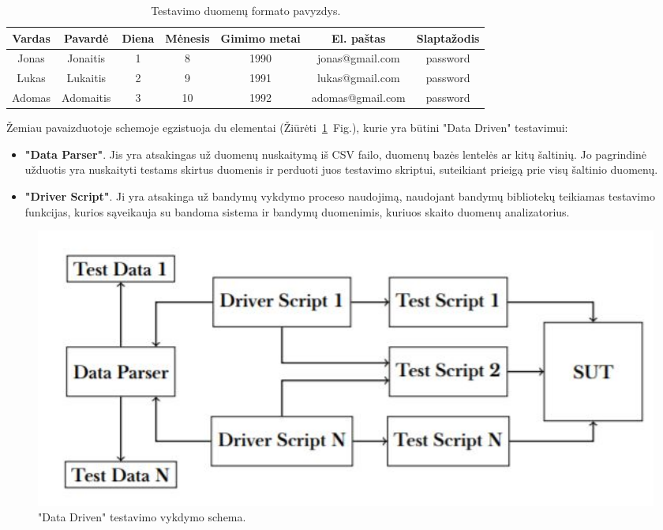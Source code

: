 \documentclass[a4paper,12pt,fleqn]{article}
\begin{document}
\begin{table}[!ht]
\centering
\begin{tabular}{ |c|c|c|c|c|c|c| }
\hline
 \textbf{Vardas} & \textbf{Pavardė} & \textbf{Diena} & \textbf{Mėnesis} & \textbf{Gimimo metai} & \textbf{El. paštas} & \textbf{Slaptažodis} \\
 \hline
 Jonas & Jonaitis & 1 & 8  & 1990 & jonas@gmail.com & password \\ 
 \hline
 Lukas  & Lukaitis   & 2 & 9  & 1991 & lukas@gmail.com & password  \\ 
 \hline
 Adomas & Adomaitis  & 3 & 10 & 1992 & adomas@gmail.com & password  \\ 
 \hline
\end{tabular}
\caption{Testavimo duomenų formato pavyzdys.}
\label{table:comparison-between-approaches}
\end{table}

Žemiau pavaizduotoje schemoje egzistuoja du elementai (Žiūrėti\ \ref{fig:data}~Fig.), kurie yra būtini "Data Driven" testavimui:
\begin{itemize}
    \item \textbf{"Data Parser"}. Jis yra atsakingas už duomenų nuskaitymą iš CSV failo, duomenų bazės lentelės ar kitų šaltinių. Jo pagrindinė užduotis yra nuskaityti testams skirtus duomenis ir perduoti juos testavimo skriptui, suteikiant prieigą prie visų šaltinio duomenų.
    
    \item \textbf{"Driver Script"}. Ji yra atsakinga už bandymų vykdymo proceso naudojimą, naudojant bandymų bibliotekų teikiamas testavimo funkcijas, kurios sąveikauja su bandoma sistema ir bandymų duomenimis, kuriuos skaito duomenų analizatorius.
\end{itemize}

\begin{figure}[h]
    \centering
    \includegraphics[width=1\textwidth]{DataDriven.JPG}
    \caption{"Data Driven" testavimo vykdymo schema.}
    \label{fig:data}
\end{figure}
\end{document}
